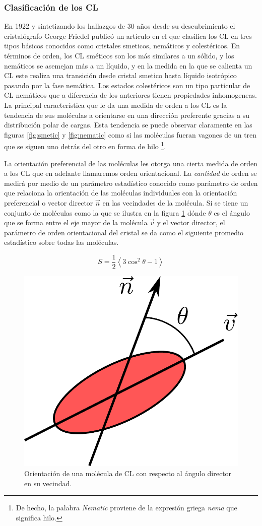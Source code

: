 \subsubsection{Clasificación de los CL}  
\label{sec:LC-clasification}
En 1922 y sintetizando los hallazgos de 30 años desde su descubrimiento el
cristalógrafo George Friedel publicó un artículo 
en el que clasifica los CL en tres tipos básicos conocidos como
cristales smeticos, nemáticos y colestéricos.
En términos de orden, los CL sméticos son los más similares a un
sólido, y los nemáticos se asemejan más a un líquido, y en la medida
en la que se calienta un CL este realiza una transición desde cristal
smetico hasta líquido isotrópico pasando por la fase nemática. Los estados
colestéricos son un tipo particular de CL nemáticos que  a diferencia
de los anteriores tienen propiedades inhomogeneas. 
La principal característica que le da una medida de orden a los CL es
la tendencia de sus moléculas a orientarse en una dirección
preferente gracias a su distribución polar de cargas. Esta tendencia
se puede observar claramente en las figuras \ref{fig:smetic} y
\ref{fig:nematic} como si las moléculas fueran vagones de un tren que
se siguen uno detrás del otro en forma de hilo \footnote{De hecho, la palabra
\textit{Nematic} proviene de la expresión griega \textit{nema} que
significa hilo.}.  

La orientación preferencial de las moléculas les
otorga una cierta medida de orden a los CL que en adelante llamaremos orden
orientacional. La \textit{cantidad} de orden se medirá por medio de un
parámetro estadístico conocido como parámetro de orden que relaciona
la orientación de las moléculas individuales con la orientación
preferencial o vector director $\vec{n}$ en las vecindades de
la molécula. Si se tiene un conjunto de moléculas como la que se
ilustra en la figura \ref{fig:angulo_director} dónde 
$\theta$ es el ángulo que se forma entre el eje mayor de la molécula
$\vec{v}$ y el vector director, el parámetro de orden orientacional
del cristal se da como el siguiente promedio estadístico sobre todas
las moléculas.

$$ S = \frac{1}{2}\left<3\cos^2{\theta-1}\right>$$
 
\begin{figure}[h!]
\centering
\includegraphics[width=.3\linewidth]{angulo_director}
\caption{Orientación de una molécula de CL con respecto al ángulo
  director en su vecindad.}
\label{fig:angulo_director}
\end{figure}

